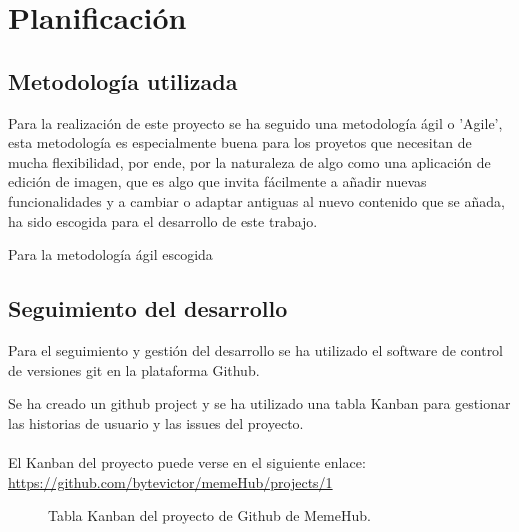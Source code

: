 \chapter{Planificación}

\section{Metodología utilizada}
    Para la realización de este proyecto se ha seguido una metodología ágil o 'Agile', esta metodología
    es especialmente buena para los proyetos que necesitan de mucha flexibilidad, por ende, por 
    la naturaleza de algo como una aplicación de edición de imagen, que es algo que invita fácilmente a añadir nuevas funcionalidades
    y a cambiar o adaptar antiguas al nuevo contenido que se añada, ha sido escogida para el desarrollo de este trabajo.

    Para la metodología ágil escogida 

    




\newpage
\section{Seguimiento del desarrollo}
Para el seguimiento y gestión del desarrollo se ha utilizado el software de control de versiones
git\cite{git} en la plataforma Github\cite{Github}.

Se ha creado un github project y se ha utilizado una tabla Kanban para gestionar las historias 
de usuario y las issues del proyecto.
\\\\
El Kanban del proyecto puede verse en el siguiente enlace:
\url{https://github.com/bytevictor/memeHub/projects/1}

\begin{figure}[!h]
  \centering
  \noindent{}
  \caption{Tabla Kanban del proyecto de Github de MemeHub.}
\end{figure}